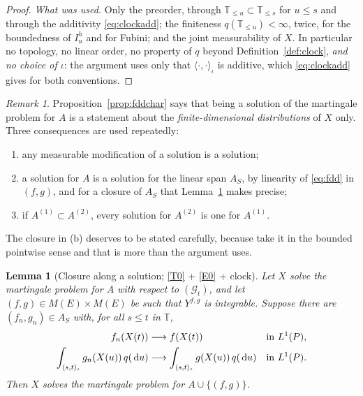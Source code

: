 \documentclass[11pt,a4paper]{article}
\theoremstyle{plain}
\newtheorem{lemma}[theorem]{Lemma}
\theoremstyle{definition}
\theoremstyle{remark}
\newtheorem{remark}[theorem]{Remark}
\newcommand{\T}{\mathbb{T}}                     %
\newcommand{\Meas}{M}                          %
\newcommand{\Gilt}{\mathcal{G}}
\newcommand{\dif}{\,\mathrm{d}}
\newcommand{\EK}{\cite{EK86}}
\begin{document}
\begin{proof}
  \emph{What was used.}  Only the preorder, through
  $\T_{\leq u} \subset \T_{\leq s}$ for $u \leq s$ and through the additivity
  \eqref{eq:clockadd}; the finiteness $q(\T_{\leq u}) < \infty$, twice, for the
  boundedness of $I^h_u$ and for Fubini; and the joint measurability of $X$.  In
  particular no topology, no linear order, no property of $q$ beyond
  Definition~\ref{def:clock}, \emph{and no choice of $\iota$}: the argument uses
  only that $\langle\cdot,\cdot\rangle_\iota$ is additive, which
  \eqref{eq:clockadd} gives for both conventions.
\end{proof}

\begin{remark}
  \label{rem:fddconsequences}
  Proposition~\ref{prop:fddchar} says that being a solution of the martingale
  problem for $A$ is a statement about the \emph{finite-dimensional
  distributions} of $X$ only.  Three consequences are used repeatedly:
  \begin{enumerate}[label=(\alph*)]
  \item any measurable modification of a solution is a solution;
  \item a solution for $A$ is a solution for the linear span $A_S$, by linearity
    of \eqref{eq:fdd} in $(f,g)$, and for a closure of $A_S$ that
    Lemma~\ref{lem:closure} makes precise;
  \item if $A^{(1)} \subset A^{(2)}$, every solution for $A^{(2)}$ is one for
    $A^{(1)}$.
  \end{enumerate}
\end{remark}

The closure in (b) deserves to be stated carefully, because \EK{} take it in the
bounded pointwise sense and that is more than the argument uses.

\begin{lemma}[Closure along a solution; \eqref{T0} + \eqref{E0} + clock]
  \label{lem:closure}
  Let $X$ solve the martingale problem for $A$ with respect to $(\Gilt_t)$, and
  let $(f,g) \in \Meas(E) \times \Meas(E)$ be such that $Y^{f,g}$ is integrable.
  Suppose there are $(f_n,g_n) \in A_S$ with, for all $s \leq t$ in $\T$,
  \begin{align}
    \label{eq:closureconv}
    f_n(X(t)) &\longrightarrow f(X(t)) &&\text{in } L^1(P) , \\
    \notag
    \int_{\langle s,t \rangle_\iota} g_n(X(u)) \, q(\dif u)
      &\longrightarrow
      \int_{\langle s,t \rangle_\iota} g(X(u)) \, q(\dif u)
      &&\text{in } L^1(P) .
  \end{align}
  Then $X$ solves the martingale problem for $A \cup \{(f,g)\}$.
\end{lemma}
\end{document}
